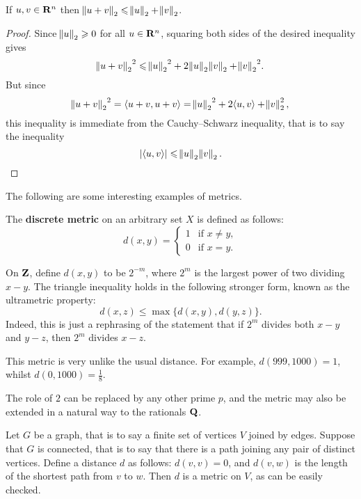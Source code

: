 \begin{lemma}
If $u,v\in\mathbf R^n$ then $\norm{u+v}_2\leqslant\norm{u}_2+\norm{v}_2$.
\end{lemma}

\begin{proof}
Since $\norm{u}_2\geqslant0$ for all $u\in\mathbf R^n$, squaring both sides of the desired inequality gives
\[{\norm{u+v}_2}^2\leqslant{\norm{u}_2}^2+2\norm{u}_2\norm{v}_2+{\norm{v}_2}^2.\]
But since
\[{\norm{u+v}_2}^2=\langle u+v,u+v\rangle={\norm{u}_2}^2+2\langle u,v\rangle+\norm{v}_2^2,\]
this inequality is immediate from the Cauchy--Schwarz inequality, that is to say the inequality
\[|\langle u,v\rangle|\leqslant\norm{u}_2\norm{v}_2.\]
\end{proof}

The following are some interesting examples of metrics.

\begin{example}
The \textbf{discrete metric} on an arbitrary set $X$ is defined as follows:
\[d(x,y)=\begin{cases}
1&\text{if }x\neq y,\\
0&\text{if }x=y.
\end{cases}\]
\end{example}

\begin{example}
On $\mathbf Z$, define $d(x,y)$ to be $2^{-m}$, where $2^m$ is the largest power of two dividing $x-y$. The triangle inequality holds in the following stronger form, known as the ultrametric property:
\[d(x,z)\le\max\{d(x,y),d(y,z)\}.\]
Indeed, this is just a rephrasing of the statement that if $2^m$ divides both $x-y$ and $y-z$, then $2^m$ divides $x-z$.

This metric is very unlike the usual distance. For example, $d(999,1000) = 1$, whilst $d(0,1000)=\frac{1}{8}$.

The role of $2$ can be replaced by any other prime $p$, and the metric may also be
extended in a natural way to the rationals $\mathbf Q$.
\end{example}

\begin{example}
Let $G$ be a graph, that is to say a finite set of vertices $V$ joined by edges. Suppose that $G$ is connected, that is to say that there is a path joining any pair of distinct vertices. Define a distance $d$ as follows: $d(v,v)=0$, and $d(v,w)$ is the length of the shortest path from $v$ to $w$. Then $d$ is a metric on $V$, as can be easily checked.
\end{example}

